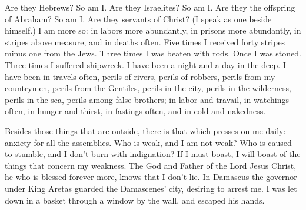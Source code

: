 {Are they Hebrews? So am I. Are they Israelites? So am I. Are they the offspring of Abraham? So am I.
Are they servants of Christ? (I speak as one beside himself.) I am more so: in labors more abundantly, in prisons more abundantly, in stripes above measure, and in deaths often.
Five times I received forty stripes minus one from the Jews.
Three times I was beaten with rods. Once I was stoned. Three times I suffered shipwreck. I have been a night and a day in the deep.
I have been in travels often, perils of rivers, perils of robbers, perils from my countrymen, perils from the Gentiles, perils in the city, perils in the wilderness, perils in the sea, perils among false brothers;
in labor and travail, in watchings often, in hunger and thirst, in fastings often, and in cold and nakedness.
\par }{\PP {}Besides those things that are outside, there is that which presses on me daily: anxiety for all the assemblies.
Who is weak, and I am not weak? Who is caused to stumble, and I don’t burn with indignation?
If I must boast, I will boast of the things that concern my weakness.
The God and Father of the Lord Jesus Christ, he who is blessed forever more, knows that I don’t lie.
In Damascus the governor under King Aretas guarded the Damascenes’ city, desiring to arrest me.
I was let down in a basket through a window by the wall, and escaped his hands.

}
